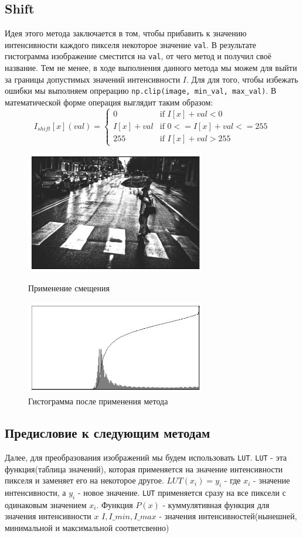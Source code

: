 \documentclass[a4paper,12pt]{article}
\begin{document}
\subsection{Shift}
Идея этого метода заключается в том, чтобы прибавить к значению интенсивности каждого пикселя некоторое значение \texttt{val}. В результате гистограмма изображение сместится на \texttt{val}, от чего метод и получил своё название. Тем не менее, в ходе выполнения данного метода мы можем для выйти за границы допустимых значений интенсивности $I$. Для для того, чтобы избежать ошибки мы выполняем опрерацию \verb|np.clip(image, min_val, max_val)|. В математической форме операция выглядит таким образом:
$$I_{shift}[x](val) = \begin{cases}
   0          &\text{if } I[x] + val < 0 \\
   I[x] + val &\text{if } 0 <= I[x] + val <= 255 \\
   255        &\text{if } I[x] + val > 255
\end{cases}$$
\begin{figure}[H]
    \centering \includegraphics[width=0.7\textwidth]{images/shift.png}
    \caption{Применение смещения}
    \centering \includegraphics[width=0.7\textwidth]{images/shift_hist.png}
    \caption{Гистограмма после применения метода}
\end{figure}
\subsection*{Предисловие к следующим методам}
Далее, для преобразования изображений мы будем использовать \verb|LUT|. \verb|LUT| - эта функция(таблица значений), которая применяется на значение интенсивности пикселя и заменяет его на некоторое другое. 
$LUT(x_i)= y_i$ - где $x_i$ - значение интенсивности, а $y_i$ - новое значение. \verb|LUT| применяется сразу на все пиксели с одинаковым значением $x_i$. 
Функция $P(x)$ - куммулятивная функция для значения интенсивности $x$
$I,I\_min, I\_max$ - значения интенсивностей(нынешней, минимальной и максимальной соответсвенно)
\end{document}

